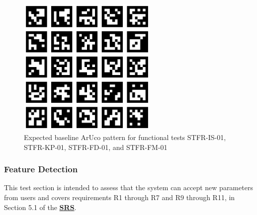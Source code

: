 \documentclass[12pt, titlepage]{article}
\begin{document}
\begin{figure}[h!]
  \begin{center}
   \includegraphics[width=0.6\textwidth]{images/aruco_000.png}
  \caption[An example of ArUco patterns within the scene of a captured greyscale image]
  {Expected baseline ArUco pattern for functional tests STFR-IS-01, STFR-KP-01, STFR-FD-01, and STFR-FM-01}
  \label{gs_aruco_field} 
  \end{center}
\end{figure}

\subsubsection{Feature Detection}
This test section is intended to assess that the system can accept new parameters from users and covers 
requirements R1 through R7 and R9 through R11, in Section 5.1 of the 
\textbf{\href{https://github.com/KiranSingh15/CAS-741-Image-Correspondences/blob/main/docs/SRS/SRS.pdf}
{SRS}}. 
		
\end{document}
